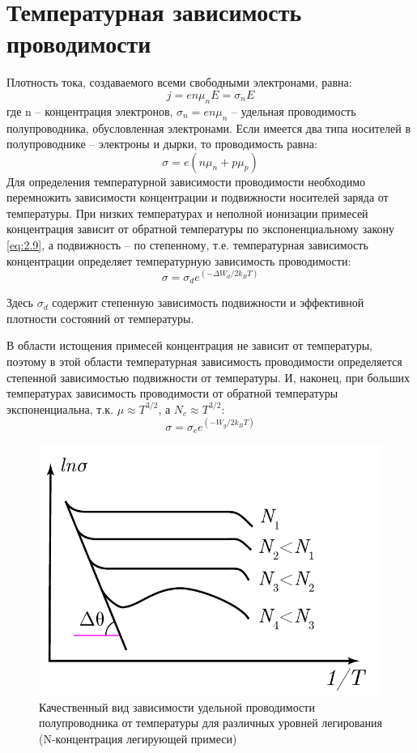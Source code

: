 		\section{Температурная зависимость проводимости}
		Плотность тока, создаваемого всеми свободными электронами, равна:
		\begin{equation}
		j=e n \mu_{n} E=\sigma_{n} E
		\label{eq:4.1}
		\end{equation}
		где n – концентрация электронов, $\sigma_n = e n \mu_n$ – удельная проводимость полупроводника, обусловленная электронами.
		Если имеется два типа носителей в полупроводнике – электроны и дырки,
		то проводимость равна:
		\begin{equation}
		\sigma=e\left(n \mu_{n}+p \mu_{p}\right)
		\label{eq:4.2}
		\end{equation}
		Для определения температурной зависимости проводимости необходимо перемножить зависимости концентрации и подвижности носителей заряда от
		температуры. При низких температурах и неполной ионизации примесей концентрация зависит от обратной температуры по экспоненциальному закону
		\eqref{eq:2.9}, а подвижность – по степенному, т.е. температурная зависимость концентрации определяет температурную зависимость проводимости:
		\begin{equation}
		\sigma=\sigma_{d} e^{\left(-\Delta W_{d} / 2 k_{B} T\right)}
		\label{eq:4.3}
		\end{equation}
		
		Здесь $\sigma_d$ содержит степенную зависимость подвижности и эффективной плотности состояний от температуры.
		
		В области истощения примесей концентрация не зависит от температуры, поэтому в этой области температурная зависимость проводимости определяется
		степенной зависимостью подвижности от температуры. И, наконец, при больших температурах зависимость проводимости от
		обратной температуры экспоненциальна, т.к. $\mu \approx T^{3/2}$, а  $N_c \approx T^{3/2}$:
		\begin{equation}
		\sigma=\sigma_{c} e^{\left(-W_{g} / 2 k_{B} T\right)}
		\label{eq:4.4}
		\end{equation}
		\begin{figure}[h!]
			\centering
			\includegraphics[width = .5\linewidth]{img/41}
			\caption{Качественный вид зависимости удельной проводимости полупроводника от температуры для различных уровней легирования (N-концентрация легирующей примеси)}
			\label{fig:4.1}
		\end{figure}
		

